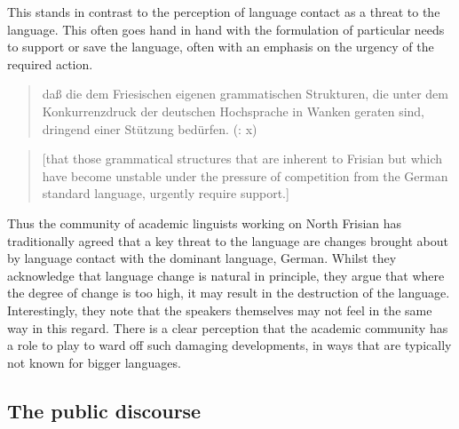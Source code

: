 \documentclass[output=paper]{langsci/langscibook}
\begin{document}
This stands in contrast to the perception of language contact as a threat to the language. This often goes hand in hand with the formulation of particular needs to support or save the language, often with an emphasis on the urgency of the required action. 

\begin{quote}
daß die dem Friesischen eigenen grammatischen Strukturen, die unter dem Konkurrenzdruck der deutschen Hochsprache in Wanken geraten sind, dringend einer Stützung bedürfen. (\citealt{WiltsEtAl1986}: x)
\end{quote}

\begin{quote}
[that those grammatical structures that are inherent to Frisian but which have become unstable under the pressure of competition from the German standard language, urgently require support.]
\end{quote}

Thus the community of academic linguists working on North Frisian has traditionally agreed that a key threat to the language are changes brought about by language contact with the dominant language, German. Whilst they acknowledge that language change is natural in principle, they argue that where the degree of change is too high, it may result in the destruction of the language. Interestingly, they note that the speakers themselves may not feel in the same way in this regard. There is a clear perception that the academic community has a role to play to ward off such damaging developments, in ways that are typically not known for bigger languages.

\subsection{The public discourse}
\label{sec:gregersen:5.2}
\end{document}
